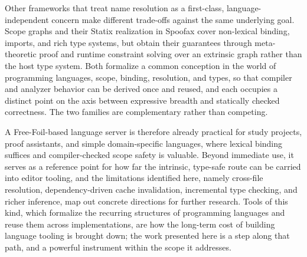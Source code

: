 Other frameworks that treat name resolution as a first-class, language-independent concern make different trade-offs against the same underlying goal.
Scope graphs and their Statix realization in Spoofax cover non-lexical binding, imports, and rich type systems, but obtain their guarantees through meta-theoretic proof and runtime constraint solving over an extrinsic graph rather than the host type system.
Both formalize a common conception in the world of programming languages, scope, binding, resolution, and types, so that compiler and analyzer behavior can be derived once and reused, and each occupies a distinct point on the axis between expressive breadth and statically checked correctness.
The two families are complementary rather than competing.

A Free-Foil-based language server is therefore already practical for study projects, proof assistants, and simple domain-specific languages, where lexical binding suffices and compiler-checked scope safety is valuable.
Beyond immediate use, it serves as a reference point for how far the intrinsic, type-safe route can be carried into editor tooling, and the limitations identified here, namely cross-file resolution, dependency-driven cache invalidation, incremental type checking, and richer inference, map out concrete directions for further research.
Tools of this kind, which formalize the recurring structures of programming languages and reuse them across implementations, are how the long-term cost of building language tooling is brought down; the work presented here is a step along that path, and a powerful instrument within the scope it addresses.
